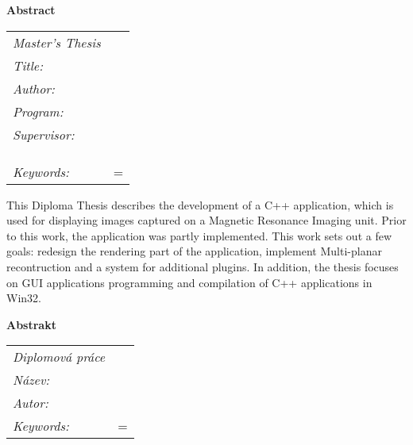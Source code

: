 \thispagestyle{empty}

\newbox\odstavecbox
\newlength\vyskaodstavce
\newcommand\odstavec[2]{
    \setbox\odstavecbox=\hbox{
         \parbox[t]{#1}{#2\vrule width 0pt depth 4pt}}
    \global\vyskaodstavce=\dp\odstavecbox
    \box\odstavecbox}
\newcommand{\delka}{120mm}


\newcommand{\pracovisteVed}{\km,\\ \fjfi,\\ \cvut}

\newcommand{\konzultant}{}
\newcommand{\pracovisteKonz}{}

\newcommand{\klicova}{programování, GUI, grafické uživatelské rozhraní, C++, Qt, DICOM}
\newcommand{\keywords}{programming, GUI, graphic user interface, C++, Qt, DICOM}   



{\noindent \bf \large Abstract} \\[5mm]
\begin{tabular}{l p{10cm}}
	{\em Master's Thesis}	& 	\\[1mm]
	{\em Title:}	& \nazeven	\\[1mm]
	{\em Author:}	& \autor	\\[1mm]
	{\em Program:} 	& \obor		\\[1mm]
	{\em Supervisor:}& \vedouci	\\
				& \km		\\
				& \fjfi		\\
				& \cvut		\\[1mm]
	{\em Keywords:}	& \odstavec{\delka}{\keywords}	\\
\end{tabular}

This Diploma Thesis describes the development of a C++ application, which is used for displaying images captured on a Magnetic Resonance Imaging unit. Prior to this work, the application was partly implemented. This work sets out a few goals: redesign the rendering part of the application, implement Multi-planar recontruction and a system for additional plugins. In addition, the thesis focuses on GUI applications programming and compilation of C++ applications in Win32.


\vspace{10mm}
{\noindent \bf \large Abstrakt} \\[5mm]
\begin{tabular}{l p{10cm}}
	{\em Diplomová práce}	& 	\\[1mm]
	{\em Název:}	& \nazevcz	\\[1mm]
	{\em Autor:}	& \autor	\\[1mm]
	{\em Keywords:}	& \odstavec{\delka}{\klicova}	\\
\end{tabular}


